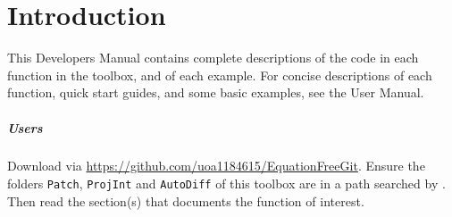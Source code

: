 \chapter{Introduction}

\begin{devMan}
This Developers Manual contains complete descriptions of the code in each function in the toolbox, and of each example.  For concise descriptions of each function, quick start guides, and some basic examples, see the User Manual.
\end{devMan}


\paragraph{Users}
Download via \url{https://github.com/uoa1184615/EquationFreeGit}.
Ensure the folders \verb|Patch|, \verb|ProjInt| and \verb|AutoDiff| of this toolbox are in a path searched by \script.
Then read the section(s) that documents the function of interest.


